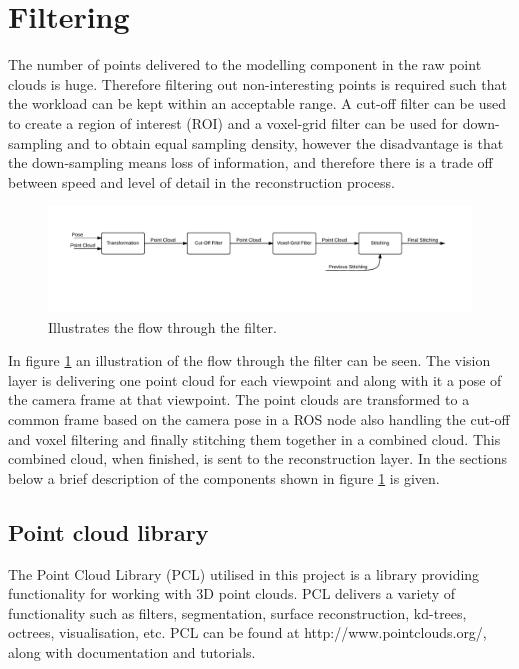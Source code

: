 \section{Filtering}

The number of points delivered to the modelling component in the raw point clouds is huge. Therefore filtering out non-interesting points is required such that the workload can be kept within an acceptable range. A cut-off filter can be used to create a region of interest (ROI) and a voxel-grid filter can be used for down-sampling and to obtain equal sampling density, however the disadvantage is that the down-sampling means loss of information, and therefore there is a trade off between speed and level of detail in the reconstruction process.  

\begin{figure}[htb]
	\begin{center}
		\includegraphics[scale=0.6,trim=20 70 0 20]{graphics/07_modelling/FilterFlow.pdf}%
		\caption{Illustrates the flow through the filter.}
		\label{fig:filter_flow}
	\end{center}
\end{figure}

In figure \ref{fig:filter_flow} an illustration of the flow through the filter can be seen. The vision layer is delivering one point cloud for each viewpoint and along with it a pose of the camera frame at that viewpoint. The point clouds are transformed to a common frame based on the camera pose in a ROS node also handling the cut-off and voxel filtering and finally stitching them together in a combined cloud. This combined cloud, when finished, is sent to the reconstruction layer. In the sections below a brief description of the components shown in figure \ref{fig:filter_flow} is given. 

\subsection{Point cloud library}
The Point Cloud Library (PCL) utilised in this project is a library providing functionality for working with 3D point clouds. PCL delivers a variety of functionality such as filters, segmentation, surface reconstruction, kd-trees, octrees, visualisation, etc. PCL can be found at http://www.pointclouds.org/, along with documentation and tutorials.

